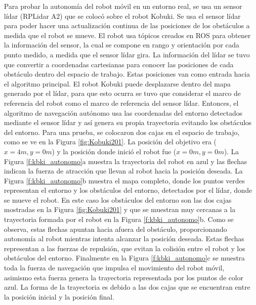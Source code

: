 Para probar la autonomía del robot móvil en un entorno real, se usa un sensor lídar 
(RPLidar A2) que se colocó sobre el robot Kobuki. Se usa el sensor lídar para poder 
hacer una actualización continua de las posiciones de los obstáculos a medida que el 
robot se mueve. El robot usa tópicos creados en ROS para obtener la información del 
sensor, la cual se compone en rango y orientación por cada punto medido, a medida que 
el sensor lídar gira. La información del lídar se tuvo que convertir a coordenadas 
cartesianas para conocer las posiciones de cada obstáculo dentro del 
espacio de trabajo. Estas posiciones van como entrada hacia el algoritmo principal. 
El robot Kobuki puede desplazarse dentro del mapa generado por el lídar, para que esto
ocurra se tuvo que considerar el marco de referencia del robot como el marco de 
referencia del sensor lídar. Entonces, el algoritmo de navegación autónomo usa 
las coordenadas del entorno detectados mediante el sensor lídar y así genera su propia 
trayectoria evitando los obstáculos del entorno. Para una prueba, se colocaron dos 
cajas en el espacio de trabajo, como se ve en la Figura \ref{fig:Kobuki201}. La posición 
del objetivo era ($x = 4 m, y = 0 m$) y la posición donde inició el robot fue 
($x = 0 m, y = 0 m$). La Figura \ref{f:kbki_autonomo}a muestra la trayectoria del robot 
en azul y las flechas indican la fuerza de atracción que llevan al robot hacia la 
posición deseada. La Figura \ref{f:kbki_autonomo}b muestra el mapa completo, donde 
los puntos verdes representan el entorno y los obstáculos del entorno, detectados por 
el lídar, donde se mueve el robot. En este caso los obstáculos del entorno son las 
dos cajas mostradas en la Figura \ref{fig:Kobuki201} y que se muestran muy cercanas 
a la trayectoria formada por el robot en la Figura \ref{f:kbki_autonomo}b. Como se 
observa, estas flechas apuntan hacia afuera del obstáculo, proporcionando autonomía 
al robot mientras intenta alcanzar la posición deseada. Estas flechas representan 
a las fuerzas de repulsión, que evitan la colisión entre el robot y los obstáculos 
del entorno. Finalmente en la Figura \ref{f:kbki_autonomo}c se muestra toda la 
fuerza de navegación que impulsa el movimiento del robot móvil, asimismo esta fuerza 
genera la trayectoria representada por los puntos de color azul. La forma de la trayectoria
es debido a las dos cajas que se encuentran entre la posición inicial y la posición final.

